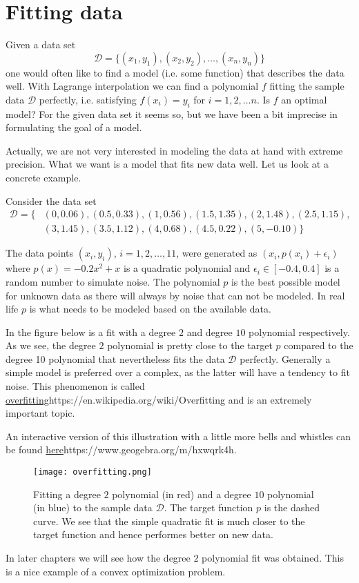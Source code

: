 \documentclass{article}
\begin{document}
\section{Fitting data}

Given a data set
$$
\mathcal{D} = \{ (x_1,y_1), (x_2,y_2), \dots, (x_n, y_n) \}
$$
one
would often like to find a model (i.e. some function) that describes
the data well. With Lagrange interpolation we can find a polynomial
$f$ fitting the sample data $\mathcal{D}$ perfectly, i.e. satisfying
$f(x_i) = y_i$ for $i = 1, 2, \dots n$. Is $ f $ an optimal model? For
the given data set it seems so, but we have been a bit imprecise in
formulating the goal of a model.

Actually, we are not very interested in modeling the data at hand
with extreme precision. What we want is a model that fits new data
well. Let us look at a concrete example.

  Consider the data set
  \begin{align*}
  \mathcal{D} = \{ {}& (0, 0.06), (0.5, 0.33), (1, 0.56), (1.5, 1.35), (2, 1.48),  (2.5, 1.15), \\
  &(3, 1.45), (3.5, 1.12), (4, 0.68), (4.5, 0.22), (5, -0.10) \} 
  \end{align*}
  
  The data points $ (x_i,y_i) $, $ i=1,2,\dots,11 $, were generated as
  $ (x_i, p(x_i) + \epsilon_i) $ where $ p(x) = -0.2 x^2 + x$ is a
  quadratic polynomial and $ \epsilon_i \in [-0.4,0.4]$ is a random
  number to simulate noise. The polynomial $ p $ is the best possible
  model for unknown data as there will always by noise that can not be
  modeled. In real life $ p $ is what needs to be modeled based on
  the available data.
  
  In the figure below is a fit with a degree $2$ and degree $10$
  polynomial respectively. As we see, the degree $2$ polynomial is
  pretty close to the target $p$ compared to the degree 10 polynomial
  that nevertheless fits the data $\mathcal{D}$ perfectly. Generally a
  simple model is preferred over a complex, as the latter will have a
  tendency to fit noise. This phenomenon is called
  \url{overfitting}{https://en.wikipedia.org/wiki/Overfitting} and is
  an extremely important topic.

  An interactive version of this illustration with a little more bells and whistles can be found \url{here}{https://www.geogebra.org/m/hxwqrk4h}.

  \begin{figure}
  \label{overfitting}
  \texttt{[image: overfitting.png]}
    \caption{Fitting a degree $2$ polynomial (in red) and a degree $10$ polynomial (in blue) to the sample data $ \mathcal{D} $. The target function $p$ is the dashed curve. We see that the simple quadratic fit is much closer to the target function and hence performes better on new data.}
  \end{figure}

  In later chapters we will see how the degree $2$ polynomial fit was
  obtained. This is a nice example of a convex
  optimization problem.%

  
\end{document}
